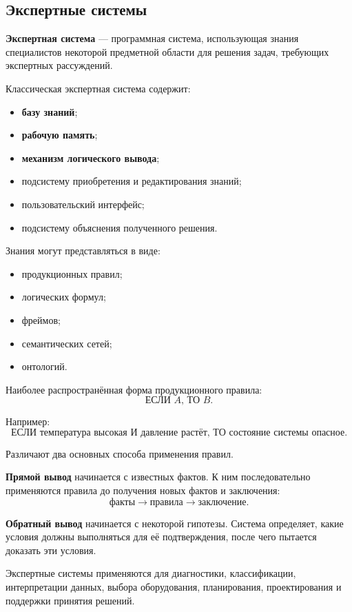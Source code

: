 \subsection{Экспертные системы}

\textbf{Экспертная система} --- программная система, использующая знания специалистов некоторой предметной области для решения задач, требующих экспертных рассуждений.

Классическая экспертная система содержит:
\begin{itemize}
	\item \textbf{базу знаний};
	\item \textbf{рабочую память};
	\item \textbf{механизм логического вывода};
	\item подсистему приобретения и редактирования знаний;
	\item пользовательский интерфейс;
	\item подсистему объяснения полученного решения.
\end{itemize}

Знания могут представляться в виде:
\begin{itemize}
	\item продукционных правил;
	\item логических формул;
	\item фреймов;
	\item семантических сетей;
	\item онтологий.
\end{itemize}

Наиболее распространённая форма продукционного правила:
\[
\text{ЕСЛИ } A \text{, ТО } B.
\]

Например:
\[
\text{ЕСЛИ температура высокая И давление растёт,
	ТО состояние системы опасное.}
\]

Различают два основных способа применения правил.

\textbf{Прямой вывод} начинается с известных фактов. К ним последовательно применяются правила до получения новых фактов и заключения:
\[
\text{факты}\rightarrow\text{правила}\rightarrow\text{заключение}.
\]

\textbf{Обратный вывод} начинается с некоторой гипотезы. Система определяет, какие условия должны выполняться для её подтверждения, после чего пытается доказать эти условия.

Экспертные системы применяются для диагностики, классификации, интерпретации данных, выбора оборудования, планирования, проектирования и поддержки принятия решений.

